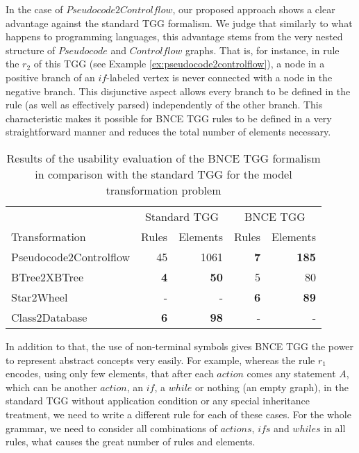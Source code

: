 \documentclass[runningheads]{llncs}
\begin{document}
In the case of $Pseudocode2Controlflow$, our proposed approach shows a clear advantage against the standard TGG formalism. We judge that similarly to what happens to programming languages, this advantage stems from the very nested structure of $Pseudocode$ and $Controlflow$ graphs. That is, for instance, in rule the $r_2$ of this TGG (see Example \ref{ex:pseudocode2controlflow}), a node in a positive branch of an $if$-labeled vertex is never connected with a node in the negative branch. This disjunctive aspect allows every branch to be defined in the rule (as well as effectively parsed) independently of the other branch. This characteristic makes it possible for BNCE TGG rules to be defined in a very straightforward manner and reduces the total number of elements necessary.

\begin{table}[t]
	\setlength{\tabcolsep}{10pt}
	\centering
	\begin{tabular}{l r r r r }
		\hline
		& \multicolumn{2}{c}{Standard TGG} & \multicolumn{2}{c}{BNCE TGG}\\
		Transformation 			& Rules & Elements 	& Rules & Elements\\
		\hline
		Pseudocode2Controlflow	& 45			& 1061	& \textbf{7}	& \textbf{185} \\
		BTree2XBTree			& \textbf{4}	& \textbf{50}	& 5		& 80 \\
		Star2Wheel				& -				& -		& \textbf{6} 	& \textbf{89} \\
		Class2Database			& \textbf{6}	& \textbf{98}	& -	& - \\
		\hline
	\end{tabular}
	\caption{Results of the usability evaluation of the BNCE TGG formalism in comparison with the standard TGG for the model transformation problem}
	\label{tab:formalism-eval}
\end{table}

In addition to that, the use of non-terminal symbols gives BNCE TGG the power to represent abstract concepts very easily. For example, whereas the rule $r_1$ encodes, using only few elements, that after each $action$ comes any statement $A$, which can be another $action$, an $if$, a $while$ or nothing (an empty graph), in the standard TGG without application condition or any special inheritance treatment, we need to write a different rule for each of these cases. For the whole grammar, we need to consider all combinations of $actions$, $ifs$ and $whiles$ in all rules, what causes the great number of rules and elements.
\end{document}
